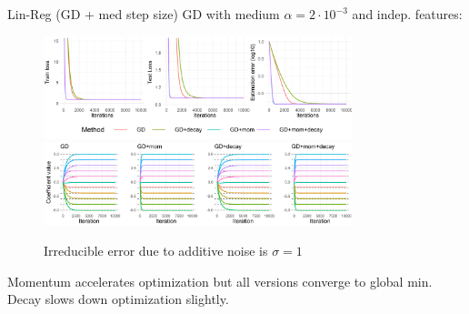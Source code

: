 \documentclass[11pt,compress,t,notes=noshow, xcolor=table]{beamer}
\begin{document}
\begin{vbframe}{Lin-Reg (GD + med step size)}
\vspace{-0.4cm}
GD with medium $\alpha=2\cdot10^{-3}$ and indep. features:
\begin{figure}
            \includegraphics[width=0.8\textwidth]{slides/04-multivariate-first-order/figure_man/simu_linmod/GD_reg_med_lr_iters.pdf} \\
             \includegraphics[width=0.8\textwidth]{slides/04-multivariate-first-order/figure_man/simu_linmod/GD_reg_coef_med.pdf}\\
            \begin{footnotesize}
                Irreducible error due to additive noise is $\sigma=1$
            \end{footnotesize}
\end{figure}
Momentum accelerates optimization but all versions converge to global min. Decay slows down optimization slightly.
\end{vbframe}
\end{document}
